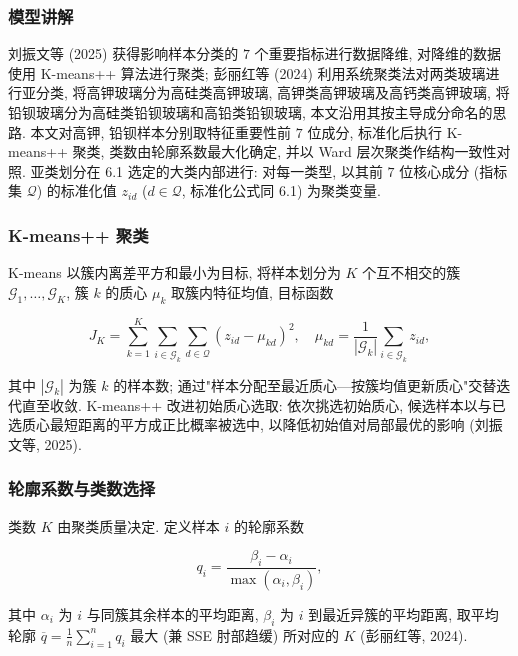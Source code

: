 \documentclass{ctexart}
\begin{document}
\subsubsection{模型讲解}

刘振文等 (2025) 获得影响样本分类的 $7$ 个重要指标进行数据降维, 对降维的数据使用 K-means++ 算法进行聚类; 彭丽红等 (2024) 利用系统聚类法对两类玻璃进行亚分类, 将高钾玻璃分为高硅类高钾玻璃, 高钾类高钾玻璃及高钙类高钾玻璃, 将铅钡玻璃分为高硅类铅钡玻璃和高铅类铅钡玻璃, 本文沿用其按主导成分命名的思路. 本文对高钾, 铅钡样本分别取特征重要性前 $7$ 位成分, 标准化后执行 K-means++ 聚类, 类数由轮廓系数最大化确定, 并以 Ward 层次聚类作结构一致性对照. 亚类划分在 6.1 选定的大类内部进行: 对每一类型, 以其前 $7$ 位核心成分 (指标集 $\mathcal{Q}$) 的标准化值 $z_{id}$ ($d\in\mathcal{Q}$, 标准化公式同 6.1) 为聚类变量.

\subsubsection{K-means++ 聚类}

K-means 以簇内离差平方和最小为目标, 将样本划分为 $K$ 个互不相交的簇 $\mathcal{G}_1,\dots,\mathcal{G}_K$, 簇 $k$ 的质心 $\mu_k$ 取簇内特征均值, 目标函数

\begin{equation*}
J_K=\sum_{k=1}^{K}\sum_{i\in\mathcal{G}_k}\sum_{d\in\mathcal{Q}}\left(z_{id}-\mu_{kd}\right)^{2},\quad\mu_{kd}=\frac{1}{\left|\mathcal{G}_k\right|}\sum_{i\in\mathcal{G}_k}z_{id},
\end{equation*}

其中 $\left|\mathcal{G}_k\right|$ 为簇 $k$ 的样本数; 通过"样本分配至最近质心—按簇均值更新质心"交替迭代直至收敛. K-means++ 改进初始质心选取: 依次挑选初始质心, 候选样本以与已选质心最短距离的平方成正比概率被选中, 以降低初始值对局部最优的影响 (刘振文等, 2025).


\subsubsection{轮廓系数与类数选择}

类数 $K$ 由聚类质量决定. 定义样本 $i$ 的轮廓系数

\begin{equation*}
q_{i}=\frac{\beta_{i}-\alpha_{i}}{\max\left(\alpha_{i},\beta_{i}\right)},
\end{equation*}

其中 $\alpha_{i}$ 为 $i$ 与同簇其余样本的平均距离, $\beta_{i}$ 为 $i$ 到最近异簇的平均距离, 取平均轮廓 $\overline{q}=\frac{1}{n}\sum_{i=1}^{n}q_{i}$ 最大 (兼 SSE 肘部趋缓) 所对应的 $K$ (彭丽红等, 2024).
\end{document}
